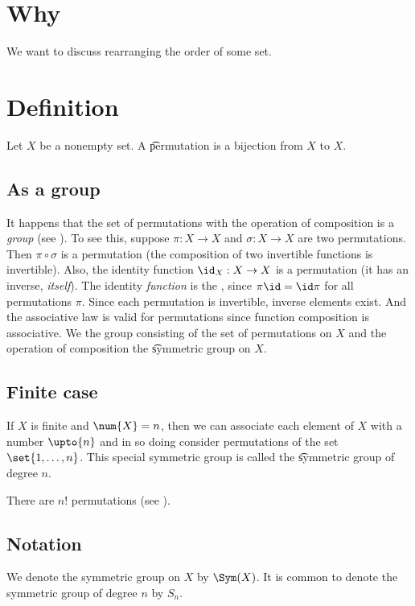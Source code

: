 
\section*{Why}

We want to discuss rearranging the order of some set.

\section*{Definition}

Let $X$ be a nonempty set.
A \t{permutation} is a bijection from $X$ to $X$.

\subsection*{As a group}

It happens that the set of permutations with the operation of composition is a \textit{group} (see ).
To see this, suppose $\pi : X \to X$ and $\sigma : X \to X$ are two permutations.
Then $\pi  \circ \sigma $ is a permutation (the composition of two invertible functions is invertible).
Also, the identity function $\id_{X}: X \to X$ is a permutation (it has an inverse, \textit{itself}).
The identity \textit{function} is the , since $\pi \id = \id\pi $ for all permutations $\pi $.
Since each permutation is invertible, inverse elements exist.
And the associative law is valid for permutations since function composition is associative.
We the group consisting of the set of permutations on $X$ and the operation of composition the \t{symmetric group on $X$}.

\subsection*{Finite case}

If $X$ is finite and $\num{X} = n$, then we can associate each element of $X$ with a number $\upto{n}$ and in so doing consider permutations of the set $\set{1, \dots , n}$.
This special symmetric group is called the \t{symmetric group of degree $n$}.

There are $n!$ permutations (see ).

\subsection*{Notation}

We denote the symmetric group on $X$ by $\Sym(X)$.
It is common to denote the symmetric group of degree $n$ by $S_n$.

\blankpage